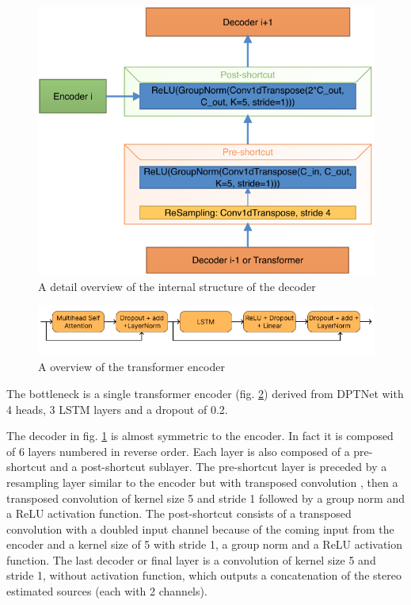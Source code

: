 \documentclass[final]{cvpr}
\begin{document}
\begin{figure}
   \includegraphics[scale=0.3]{decoder.png}
   \caption{A detail overview of the internal structure of the decoder}
   \label{decoder}
\end{figure}

\begin{figure}
   \includegraphics[scale=0.4]{transformer.png}
   \caption{A overview of the transformer encoder}
   \label{transformer}
\end{figure}
The bottleneck is a single transformer encoder (fig. \ref{transformer}) derived from DPTNet\cite{dptnet} with 4 heads, 3 LSTM layers and a dropout of 0.2.


The decoder in fig. \ref{decoder} is almost symmetric to the encoder. In fact it is composed of 6 layers numbered in reverse order. Each layer is also composed of a pre-shortcut and a post-shortcut sublayer. The pre-shortcut layer is preceded by a resampling layer similar to the encoder but with transposed convolution \cite{waveunet}, then a transposed convolution of kernel size 5 and stride 1 followed by a group norm and a ReLU activation function. The post-shortcut consists of a transposed convolution with a doubled input channel because of the coming input from the encoder and a kernel size of 5 with stride 1, a group norm and a ReLU activation function.
The last decoder or final layer is a convolution of kernel size 5 and stride 1, without activation function, which outputs a concatenation of the stereo estimated sources (each with 2 channels).
\end{document}
